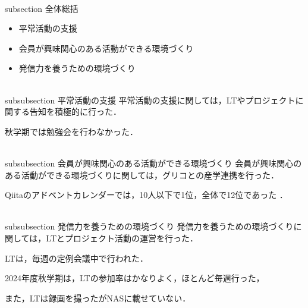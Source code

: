 \\subsection {全体総括}


\begin{itemize}
    \item 平常活動の支援
    \item 会員が興味関心のある活動ができる環境づくり
    \item 発信力を養うための環境づくり
\end{itemize}

\\subsubsection {平常活動の支援}
平常活動の支援に関しては，LTやプロジェクトに関する告知を積極的に行った．

秋学期では勉強会を行わなかった．　

\\subsubsection {会員が興味関心のある活動ができる環境づくり}
会員が興味関心のある活動ができる環境づくりに関しては，グリコとの産学連携を行った．

Qiitaのアドベントカレンダーでは，10人以下で1位，全体で12位であった  ．


\\subsubsection {発信力を養うための環境づくり}
発信力を養うための環境づくりに関しては，LTとプロジェクト活動の運営を行った．

LTは，毎週の定例会議中で行われた．

2024年度秋学期は，LTの参加率はかなりよく，ほとんど毎週行った，

また，LTは録画を撮ったがNASに載せていない．
